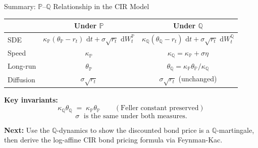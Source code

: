 \documentclass[compress]{beamer}
\newcommand{\PP}{\mathbb{P}}
\newcommand{\QQ}{\mathbb{Q}}
\newcommand{\dd}{\,\mathrm{d}}
\begin{document}
\begin{frame}{Summary: $\PP$--$\QQ$ Relationship in the CIR Model}

\begin{center}
\renewcommand{\arraystretch}{1.4}
\begin{tabular}{lcc}
\toprule
& Under $\PP$ & Under $\QQ$ \\
\midrule
SDE & $\kappa_\PP(\theta_\PP - r_t)\,\dd t + \sigma\sqrt{r_t}\,\dd W_t^\PP$ 
    & $\kappa_\QQ(\theta_\QQ - r_t)\,\dd t + \sigma\sqrt{r_t}\,\dd W_t^\QQ$ \\
Speed & $\kappa_\PP$ & $\kappa_\QQ = \kappa_\PP + \sigma\eta$ \\
Long-run & $\theta_\PP$ & $\theta_\QQ = \kappa_\PP\theta_\PP / \kappa_\QQ$ \\
Diffusion & $\sigma\sqrt{r_t}$ & $\sigma\sqrt{r_t}$ (unchanged) \\
\bottomrule
\end{tabular}
\end{center}

\medskip
\textbf{Key invariants:}
\[
	\kappa_\QQ\theta_\QQ \;=\; \kappa_\PP\theta_\PP \qquad (\text{Feller constant preserved})
\]
\[
	\sigma \;\text{ is the same under both measures.}
\]

\medskip
\textbf{Next:} Use the $\QQ$-dynamics to show the discounted bond price is a $\QQ$-martingale, then derive the log-affine CIR bond pricing formula via Feynman-Kac.

\end{frame}

\appendix

\end{document}
